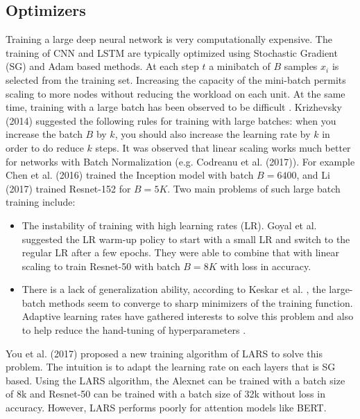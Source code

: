 \subsection{Optimizers}


Training a large deep neural network is very computationally expensive. The training of CNN and LSTM are typically optimized using Stochastic Gradient (SG) and Adam based methods.  At each step $t$ a minibatch of $B$ samples $x_i$
is selected from the training set. Increasing the capacity of the mini-batch permits scaling to more nodes without reducing
the workload on each unit. At the same time, training with a large batch has been observed to be difficult \cite{Krizhevsky}. Krizhevsky (2014) suggested the following rules for training with large batches: when you increase
the batch $B$ by $k$, you should also increase the learning rate by $k$ in order to do reduce $k$ steps.  It was observed that linear scaling works much better for networks with Batch
Normalization (e.g. Codreanu et al. (2017)). For example Chen et al. (2016) trained the Inception
model with batch $B=6400$, and Li (2017) trained Resnet-152 for $B=5K$. Two main problems of such large batch training include: 

\begin{itemize}
    \item The instability of training with high learning rates (LR). Goyal et al. suggested the LR warm-up policy to start with a small LR and switch to the regular LR after a few epochs. They were able to combine that with linear scaling to train Resnet-50 with batch $B=8K$ with loss in accuracy. 
    
    \item There is a lack of generalization ability, according to Keskar et al. \cite{Keskar}, the large-batch methods seem to converge to sharp minimizers of the training function. Adaptive learning rates have gathered interests to solve this problem and also to help reduce the hand-tuning of hyperparameters \cite{adaplr}.  
\end{itemize}




You et al. (2017) proposed a new training algorithm of LARS to solve this problem. The intuition is to adapt the learning rate on each layers that is SG based. Using the LARS algorithm, the Alexnet can be trained with a batch size of 8k and Resnet-50 can be trained with a batch size of 32k without loss in accuracy. However, LARS performs poorly for attention models like BERT. 


